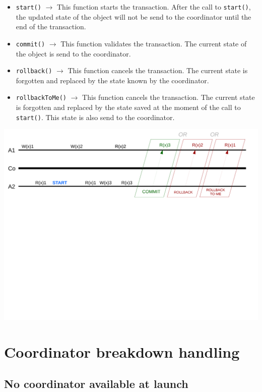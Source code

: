 \documentclass{article}
\begin{document}
\begin{itemize}
\item \texttt{start()} $\rightarrow$ This function starts the transaction. After the call to \texttt{start()}, the updated state of the object will not be send to the coordinator until the end of the transaction. 
\item \texttt{commit()} $\rightarrow$ This function validates the transaction. The current state of the object is send to the coordinator.
\item \texttt{rollback()} $\rightarrow$ This function cancels the transaction. The current state is forgotten and replaced by the state known by the coordinator.
\item \texttt{rollbackToMe()} $\rightarrow$ This function cancels the transaction. The current state is forgotten and replaced by the state saved at the moment of the call to \texttt{start()}. This state is also send to the coordinator.
\end{itemize}

\begin{center}
\includegraphics[width=16.85cm, clip, trim=0.4cm 13.2cm 0.6cm 0.2cm]{sch2}
\end{center}

\section{Coordinator breakdown handling}

\subsection{No coordinator available at launch}
\end{document}
